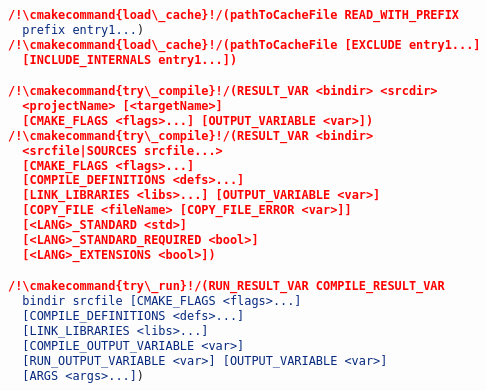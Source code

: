 \documentclass{article}
\newcommand{\cmakecommand}[1]{{\href{https://cmake.org/cmake/help/v3.13/command/#1.html}{#1}}}
\begin{document}
\begin{minipage}[t]{0.18\linewidth}
\begin{lstlisting}[language=CMake]
/!\cmakecommand{load\_cache}!/(pathToCacheFile READ_WITH_PREFIX
  prefix entry1...)
/!\cmakecommand{load\_cache}!/(pathToCacheFile [EXCLUDE entry1...]
  [INCLUDE_INTERNALS entry1...])

/!\cmakecommand{try\_compile}!/(RESULT_VAR <bindir> <srcdir>
  <projectName> [<targetName>]
  [CMAKE_FLAGS <flags>...] [OUTPUT_VARIABLE <var>])
/!\cmakecommand{try\_compile}!/(RESULT_VAR <bindir>
  <srcfile|SOURCES srcfile...>
  [CMAKE_FLAGS <flags>...]
  [COMPILE_DEFINITIONS <defs>...]
  [LINK_LIBRARIES <libs>...] [OUTPUT_VARIABLE <var>]
  [COPY_FILE <fileName> [COPY_FILE_ERROR <var>]]
  [<LANG>_STANDARD <std>]
  [<LANG>_STANDARD_REQUIRED <bool>]
  [<LANG>_EXTENSIONS <bool>])

/!\cmakecommand{try\_run}!/(RUN_RESULT_VAR COMPILE_RESULT_VAR
  bindir srcfile [CMAKE_FLAGS <flags>...]
  [COMPILE_DEFINITIONS <defs>...]
  [LINK_LIBRARIES <libs>...]
  [COMPILE_OUTPUT_VARIABLE <var>]
  [RUN_OUTPUT_VARIABLE <var>] [OUTPUT_VARIABLE <var>]
  [ARGS <args>...])
\end{lstlisting}
\end{minipage}
\hfill\vline\hfill
\end{document}
